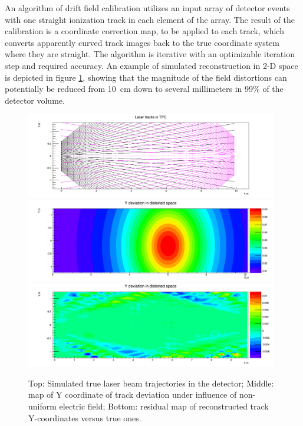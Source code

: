 An algorithm of drift field calibration utilizes an input array of detector events with one straight ionization track in each element of the array. The result of the calibration is a coordinate correction map, to be applied to each track, which converts apparently curved track images back to the true coordinate system where they are straight. The algorithm is iterative with an optimizable iteration step and required accuracy. An example of simulated reconstruction in 2-D space is depicted in figure \ref{Reco}, showing that the magnitude of the field distortions can potentially be reduced from 10~cm down to several millimeters in 99\% of the detector volume.


\begin{figure}[htb]
\centering	
\includegraphics[width=0.98\textwidth]{figures/Original_Tracks.pdf}
\includegraphics[width=0.98\textwidth]{figures/Ydev.pdf}
\includegraphics[width=0.98\textwidth]{figures/Yresidual.pdf}
\caption{Top: Simulated true laser beam trajectories in the detector; Middle: map of Y coordinate of track deviation under influence of non-uniform electric field; Bottom: residual map of reconstructed track Y-coordinates versus true ones.} 
\label{Reco}
\end{figure}


